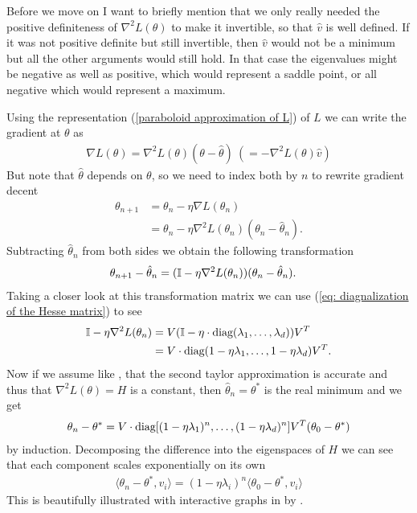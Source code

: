Before we move on I want to briefly mention that we only really needed the
positive definiteness of \(\nabla^2 L(\theta)\) to make it invertible, so that
\(\hat{v}\) is well defined. If it was not positive definite but still invertible,
then \(\hat{v}\) would not be a minimum but all the other arguments would still
hold.
In that case the eigenvalues might be negative as well as positive, which would
represent a saddle point, or all negative which would represent a maximum.

Using the representation (\ref{paraboloid approximation of L}) of \(L\) we
can write the gradient at \(\theta\) as
%
\begin{align*}
	\nabla L(\theta)
	=  \nabla^2 L(\theta)(\theta-\hat{\theta})
	\ (= -\nabla^2 L(\theta)\hat{v})
\end{align*}
%
But note that \(\hat{\theta}\) depends on \(\theta\), so we need to index both
by \(n\) to rewrite gradient decent
%
\begin{align*}
	\theta_{n+1} &= \theta_n - \eta\nabla L(\theta_n)\\
	&= \theta_n - \eta\nabla^2 L(\theta_n)(\theta_n - \hat{\theta}_n).
\end{align*}
%
Subtracting \(\hat{\theta}_n\) from both sides we obtain the following
transformation 
%
\begin{align*}
	\theta_{n+1} - \hat{\theta}_n
	&= (\mathbb{I} - \eta\nabla^2 L(\theta_n) ) (\theta_n - \hat{\theta}_n).
\end{align*}
%
Taking a closer look at this transformation matrix we can use (\ref{eq:
diagnalization of the Hesse matrix}) to see
%
\begin{align*}
	\mathbb{I} - \eta\nabla^2 L(\theta_n)
	&= V(\mathbb{I} - \eta\cdot\text{diag}(\lambda_1,\dots,\lambda_d) )V^T \\
	&= V\cdot\text{diag}(1-\eta\lambda_1, \dots,1-\eta\lambda_d)V^T.
\end{align*}
%
Now if we assume like \textcite{gohWhyMomentumReally2017}, that the second
taylor approximation is accurate and thus that \(\nabla^2 L(\theta)=H\) is a
constant, then \(\hat{\theta}_n = \theta^*\) is the real minimum and we get
%
\begin{align}
	\theta_n - \theta^*
	= V\cdot\text{diag}[(1-\eta\lambda_1)^n,\dots,(1-\eta\lambda_d)^n] V^T (\theta_0 - \theta^*)
\end{align}
%
by induction. Decomposing the difference into the eigenspaces of \(H\) we can 
see that each component scales exponentially on its own 
%
\begin{align*}
	\langle \theta_n -\theta^*, v_i\rangle
	= (1-\eta\lambda_i)^n \langle \theta_0 - \theta^*, v_i\rangle
\end{align*}
%
This is beautifully illustrated with interactive graphs in
 by \citeauthor{gohWhyMomentumReally2017}.

